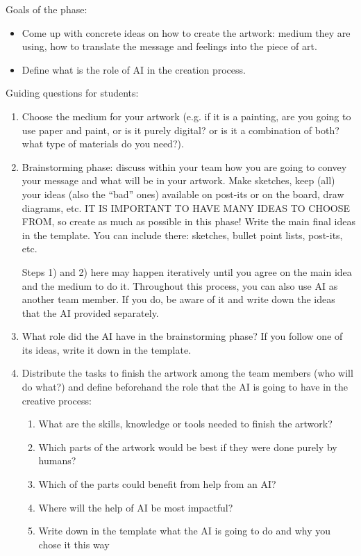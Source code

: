 \documentclass[12pt]{article}
\newcounter{question}
\begin{document}
Goals of the phase: 
\begin{itemize}
\item Come up with concrete ideas on how to create the artwork: medium they are using, how to translate the message and feelings into the piece of art.
\item Define what is the role of AI in the creation process.
\end{itemize}

Guiding questions for students: 

\begin{enumerate}
\item Choose the medium for your artwork (e.g. if it is a painting, are you going to use paper and paint, or is it purely digital? or is it a combination of both? what type of materials do you need?).
\item Brainstorming phase: discuss within your team how you are going to convey your message and what will be in your artwork. Make sketches, keep (all) your ideas (also the “bad” ones) available on post-its or on the board, draw diagrams, etc. IT IS IMPORTANT TO HAVE MANY IDEAS TO CHOOSE FROM, so create as much as possible in this phase! Write the main final ideas in the template. You can include there: sketches, bullet point lists, post-its, etc.

Steps 1) and 2) here may happen iteratively until you agree on the main idea and the medium to do it. Throughout this process, you can also use AI as another team member. If you do, be aware of it and write down the ideas that the AI provided separately.

\item What role did the AI have in the brainstorming phase? If you follow one of its ideas, write it down in the template.

\item Distribute the tasks to finish the artwork among the team members (who will do what?) and define beforehand the role that the AI is going to have in the creative process:

\begin{enumerate}
\item What are the skills, knowledge or tools needed to finish the artwork?
\item Which parts of the artwork would be best if they were done purely by humans? 
\item Which of the parts could benefit from help from an AI? 
\item Where will the help of AI be most impactful?
\item Write down in the template what the AI is going to do and why you chose it this way
\end{enumerate}
\end{enumerate}
\end{document}
